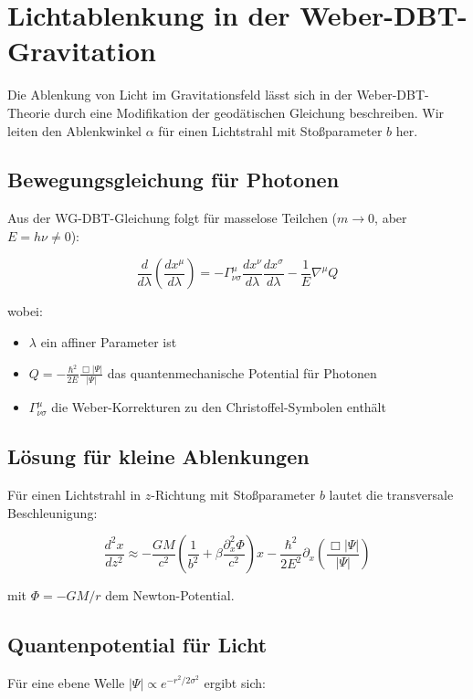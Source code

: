 \newpage
\section{Lichtablenkung in der Weber-DBT-Gravitation}
\label{sec:light_deflection}

Die Ablenkung von Licht im Gravitationsfeld lässt sich in der Weber-DBT-Theorie durch eine Modifikation der geodätischen Gleichung beschreiben. Wir leiten den Ablenkwinkel $\alpha$ für einen Lichtstrahl mit Stoßparameter $b$ her.

\subsection{Bewegungsgleichung für Photonen}
Aus der WG-DBT-Gleichung folgt für masselose Teilchen ($m \to 0$, aber $E = h\nu \neq 0$):

\begin{equation}
\frac{d}{d\lambda}\left(\frac{dx^\mu}{d\lambda}\right) = -\Gamma^\mu_{\nu\sigma}\frac{dx^\nu}{d\lambda}\frac{dx^\sigma}{d\lambda} - \frac{1}{E}\nabla^\mu Q
\end{equation}

wobei:
\begin{itemize}
\item $\lambda$ ein affiner Parameter ist
\item $Q = -\frac{\hbar^2}{2E}\frac{\Box|\Psi|}{|\Psi|}$ das quantenmechanische Potential für Photonen
\item $\Gamma^\mu_{\nu\sigma}$ die Weber-Korrekturen zu den Christoffel-Symbolen enthält
\end{itemize}

\subsection{Lösung für kleine Ablenkungen}
Für einen Lichtstrahl in $z$-Richtung mit Stoßparameter $b$ lautet die transversale Beschleunigung:

\begin{equation}
\frac{d^2x}{dz^2} \approx -\frac{GM}{c^2}\left(\frac{1}{b^2} + \beta\frac{\partial^2_x \Phi}{c^2}\right)x - \frac{\hbar^2}{2E^2}\partial_x\left(\frac{\Box|\Psi|}{|\Psi|}\right)
\end{equation}

mit $\Phi = -GM/r$ dem Newton-Potential. 

\subsection{Quantenpotential für Licht}
Für eine ebene Welle $|\Psi| \propto e^{-r^2/2\sigma^2}$ ergibt sich:


